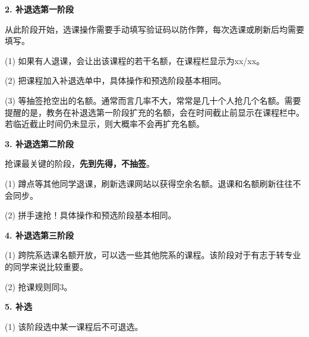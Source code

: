 \vspace{10pt}

\textbf{2. 补退选第一阶段}

从此阶段开始，选课操作需要手动填写验证码以防作弊，每次选课或刷新后均需要填写。

\vspace{10pt}

(1) 如果有人退课，会让出该课程的若干名额，在课程栏显示为xx/xx。

\vspace{10pt}

(2) 把课程加入补退选单中，具体操作和预选阶段基本相同。

\vspace{10pt}

(3) 等抽签抢空出的名额。通常而言几率不大，常常是几十个人抢几个名额。需要提醒的是，教务在补退选第一阶段扩充的名额，会在时间截止前显示在课程栏中。若临近截止时间仍未显示，则大概率不会再扩充名额。

\vspace{10pt}

\textbf{3. 补退选第二阶段}

抢课最关键的阶段，\textbf{先到先得，不抽签}。

\vspace{10pt}

(1) 蹲点等其他同学退课，刷新选课网站以获得空余名额。退课和名额刷新往往不会同步。

\vspace{10pt}

(2) 拼手速抢！具体操作和预选阶段基本相同。

\vspace{10pt}

\textbf{4. 补退选第三阶段}

\vspace{10pt}

(1) 跨院系选课名额开放，可以选一些其他院系的课程。该阶段对于有志于转专业的同学来说比较重要。

\vspace{10pt}

(2) 抢课规则同3。

\vspace{10pt}

\textbf{5. 补选}

\vspace{10pt}

(1) 该阶段选中某一课程后不可退选。

\vspace{10pt}

